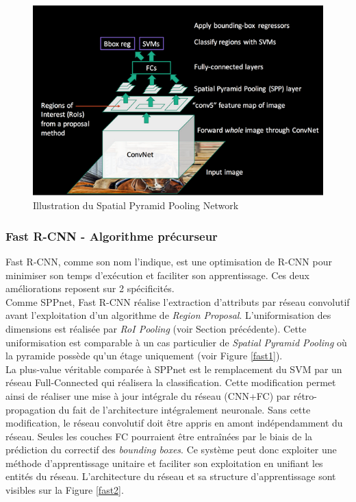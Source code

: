 \begin{figure}
    \centering
    \includegraphics[scale=0.4]{./tex/computer-vision/sota/sppnet.png}
    \caption{Illustration du Spatial Pyramid Pooling Network}
    \label{sppnet}
\end{figure}

\subsubsection{Fast R-CNN - Algorithme précurseur}
Fast R-CNN\cite{fastcnn}, comme son nom l'indique, est une optimisation de R-CNN pour minimiser son temps d'exécution et faciliter son apprentissage. Ces deux améliorations reposent sur 2 spécificités.\\

\noindent Comme SPPnet, Fast R-CNN réalise l'extraction d'attributs par réseau convolutif avant l'exploitation d'un algorithme de \textit{Region Proposal}. L'uniformisation des dimensions est réalisée par \textit{RoI Pooling} (voir Section précédente). Cette uniformisation est comparable à un cas particulier de \textit{Spatial Pyramid Pooling} où la pyramide possède qu'un étage uniquement (voir Figure \ref{fast1}).\\

\noindent La plus-value véritable comparée à SPPnet est le remplacement du SVM par un réseau Full-Connected qui réalisera la classification. Cette modification permet ainsi de réaliser une mise à jour intégrale du réseau (CNN+FC) par rétro-propagation du fait de l'architecture intégralement neuronale. Sans cette modification, le réseau convolutif doit être appris en amont indépendamment du réseau. Seules les couches FC pourraient être entraînées par le biais de la prédiction du correctif des \textit{bounding boxes}. Ce système peut donc exploiter une méthode d'apprentissage unitaire et faciliter son exploitation en unifiant les entités du réseau. L'architecture du réseau et sa structure d'apprentissage sont visibles sur la Figure \ref{fast2}.

